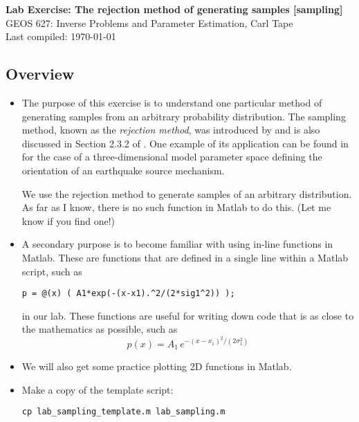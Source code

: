 \documentclass[11pt,titlepage,fleqn]{article}
\begin{document}

\begin{spacing}{1.2}
\centering
{\large \bf Lab Exercise: The rejection method of generating samples [sampling]} \\
GEOS 627: Inverse Problems and Parameter Estimation, Carl Tape \\
Last compiled: \today
\end{spacing}


\subsection*{Overview}

\begin{itemize}
\item The purpose of this exercise is to understand one particular method of generating samples from an arbitrary probability distribution. The sampling method, known as the {\em rejection method}, was introduced by \citet{vonNeumann1951} and is also discussed in Section 2.3.2 of \citet{Tarantola2005}. One example of its application can be found in \citet{SilwalTape2016} for the case of a three-dimensional model parameter space defining the orientation of an earthquake source mechanism.

We use the rejection method to generate samples of an arbitrary distribution. As far as I know, there is no such function in Matlab to do this. (Let me know if you find one!)

\item A secondary purpose is to become familiar with using in-line functions in Matlab. These are functions that are defined in a single line within a Matlab script, such as

\verb+p = @(x) ( A1*exp(-(x-x1).^2/(2*sig1^2)) );+

in our lab. These functions are useful for writing down code that is as close to the mathematics as possible, such as
%
\begin{equation}
p(x) = A_1\,e^{-(x-x_1)^2/(2\sigma_1^2)}
\end{equation}

\item We will also get some practice plotting 2D functions in Matlab.

\item Make a copy of the template script:
%
\begin{verbatim}
cp lab_sampling_template.m lab_sampling.m
\end{verbatim}

\end{itemize}
\end{document}
